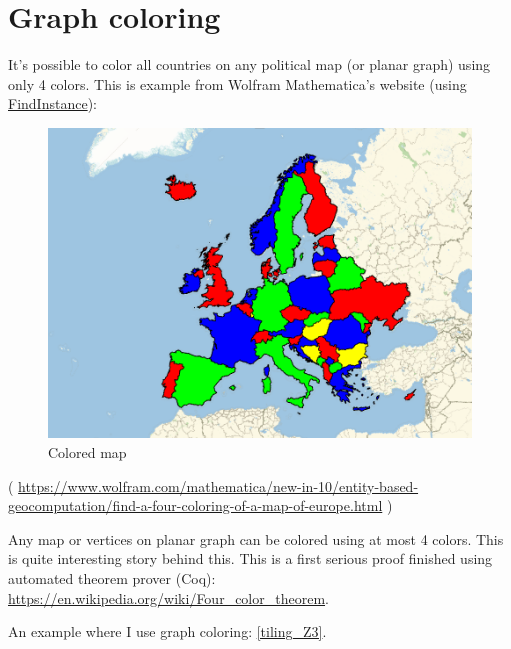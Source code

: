 \section{Graph coloring}

It's possible to color all countries on any political map (or planar graph) using only 4 colors.
This is example from Wolfram Mathematica's website
(using \href{http://reference.wolfram.com/language/ref/FindInstance.html}{FindInstance}):

\begin{figure}[H]
\centering
\includegraphics[scale=0.75]{color/map.png}
\caption{Colored map}
\end{figure}

( \url{https://www.wolfram.com/mathematica/new-in-10/entity-based-geocomputation/find-a-four-coloring-of-a-map-of-europe.html} )

Any map or vertices on planar graph can be colored using at most 4 colors.
This is quite interesting story behind this.
This is a first serious proof finished using automated theorem prover (Coq):
\url{https://en.wikipedia.org/wiki/Four_color_theorem}.

An example where I use graph coloring: \ref{tiling_Z3}.




